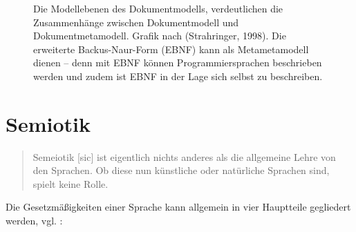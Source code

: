  
\begin{figure}[h!]
\centering
\advance\leftskip-2.5cm
\caption[Modellebenen des Dokumentmodells]{ Die Modellebenen des Dokumentmodells, verdeutlichen die Zusammenhänge zwischen Dokumentmodell und Dokumentmetamodell. Grafik nach (Strahringer, 1998). Die erweiterte Backus-Naur-Form (EBNF) kann als Metametamodell dienen -- denn mit EBNF können Programmiersprachen beschrieben werden und zudem ist EBNF in der Lage sich selbst zu beschreiben. }\label{metamodellschema}
\end{figure}
 
\section{Semiotik}\label{semiotik-sec}
 
\begin{quote}
 Semeiotik [sic] ist eigentlich nichts anderes als die allgemeine Lehre von den Sprachen. Ob diese nun künstliche oder natürliche Sprachen sind, spielt keine Rolle. \citep[S.~8]{Malissa}
\end{quote}
 
Die Gesetzmäßigkeiten einer Sprache kann allgemein in vier Hauptteile gegliedert werden, vgl. \citep[S.~8]{Malissa}:

